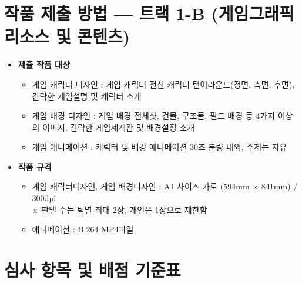 \documentclass[11pt, a4paper]{article}
\begin{document}
\section{작품 제출 방법 — 트랙 1-B (게임그래픽 리소스 및 콘텐츠)}

\begin{infocard}
\begin{itemize}[leftmargin=1.5em, itemsep=6pt, label={\color{primary}\textbullet}]
  \item \textbf{제출 작품 대상}
    \begin{itemize}[leftmargin=1.5em, itemsep=2pt, label={\color{textmuted}$\triangleright$}]
      \item 게임 캐릭터 디자인 : 게임 캐릭터 전신 캐릭터 턴어라운드(정면, 측면, 후면),
            간략한 게임설명 및 캐릭터 소개
      \item 게임 배경 디자인 : 게임 배경 전체샷, 건물, 구조물, 필드 배경 등 4가지 이상의 이미지,
            간략한 게임세계관 및 배경설정 소개
      \item 게임 애니메이션 : 캐릭터 및 배경 애니메이션 30초 분량 내외, 주제는 자유
    \end{itemize}
  \item \textbf{작품 규격}
    \begin{itemize}[leftmargin=1.5em, itemsep=2pt, label={\color{textmuted}$\triangleright$}]
      \item 게임 캐릭터디자인, 게임 배경디자인 : A1 사이즈 가로 (594mm $\times$ 841mm) / 300dpi\\
            {\small\color{textmuted} ※ 판넬 수는 팀별 최대 2장, 개인은 1장으로 제한함}
      \item 애니메이션 : H.264 MP4파일
    \end{itemize}
\end{itemize}
\end{infocard}


\section{심사 항목 및 배점 기준표}
\end{document}
